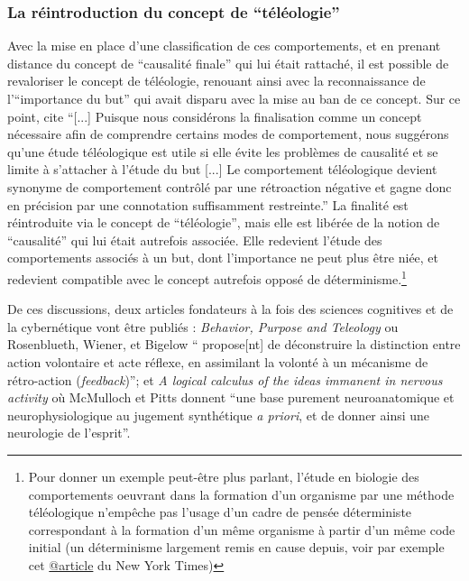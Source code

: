
\subsubsection{La réintroduction du concept de \enquote{téléologie}}

Avec la mise en place d'une classification de ces comportements, et en prenant distance du concept de \enquote{causalité finale} qui lui était rattaché, il est possible de revaloriser le concept de téléologie, renouant ainsi avec la reconnaissance de l'\enquote{importance du but} qui avait disparu avec la mise au ban de ce concept. Sur ce point, \textcite[776]{Pouvreau2013} cite \textcite[23-24]{Rosenblueth1943} \enquote{[...] Puisque nous considérons la finalisation comme un concept nécessaire afin de comprendre certains modes de comportement, nous suggérons qu'une étude téléologique est utile si elle évite les problèmes de causalité et se limite à s'attacher à l'étude du but [...] Le comportement téléologique devient synonyme de comportement contrôlé par une rétroaction négative et gagne donc en précision par une connotation suffisamment restreinte.} La finalité est réintroduite via le concept de \enquote{téléologie}, mais elle est libérée de la notion de \enquote{causalité} qui lui était autrefois associée. Elle redevient l'étude des comportements associés à un but, dont l'importance ne peut plus être niée, et redevient compatible avec le concept autrefois opposé de déterminisme.\footnote{Pour donner un exemple peut-être plus parlant, l'étude en biologie des comportements oeuvrant dans la formation d'un organisme par une méthode téléologique n'empêche pas l'usage d'un cadre de pensée déterministe  correspondant à la formation d'un même organisme à partir d'un même code initial (un déterminisme largement remis en cause depuis, voir par exemple cet \href{http://www.nytimes.com/2014/01/21/science/seeing-x-chromosomes-in-a-new-light.html?ref=science&_r=0}{@article} du New York Times)}

De ces discussions, deux articles fondateurs à la fois des sciences cognitives \autocite[23]{Dupuy2000} et de la cybernétique vont être publiés : \textit{Behavior, Purpose and Teleology} ou Rosenblueth, Wiener, et Bigelow \enquote{ propose[nt] de déconstruire la distinction entre action volontaire et acte réflexe, en assimilant la volonté à un mécanisme de rétro-action (\textit{feedback})}; et \textit{A logical calculus of the ideas immanent in nervous activity} où McMulloch et Pitts donnent \enquote{une base purement neuroanatomique et neurophysiologique au jugement synthétique \textit{a priori}, et de donner ainsi une neurologie de l'esprit}.

